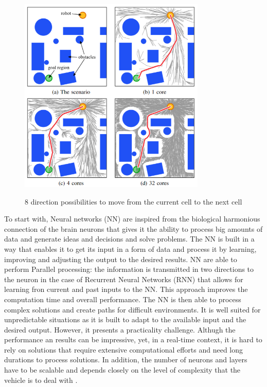 \begin{figure}[H]
    \begin{center}
       \includegraphics[width=3.5in]{images/Chap1/sampling-based.png}\\
       \caption{8 direction possibilities to move from the current cell to the next cell \cite{R16}}
       \label{sampling-based}
       \end{center}
\end{figure}

To start with, Neural networks (NN) are inspired from the biological harmonious connection of the brain neurons
that gives it the ability to process big amounts of data and generate ideas and decisions and solve problems. 
The NN is built in a way that enables it to get its input in a form of data and process it by learning, improving 
and adjusting the output to the desired results. NN are able to perform Parallel processing: the information is 
transmitted in two
directions to the neuron in the case of Recurrent Neural Networks (RNN) that allows for learning fron current and 
past inputs to the NN. This approach improves the computation time and overall performance. 
The NN is then able to process complex solutions and create paths for difficult environments. 
It is well suited for unpredictable situations as it is built to adapt to the available input and the desired output.
However, it presents a practicality challenge. Althugh the performance an results can be impressive, yet, in a 
real-time context, 
it is hard to rely on solutions that require extensive computational efforts and need long durations to 
process solutions. In addition, the number of neurons and layers have to be scalable and depends closely on the 
level of complexity that the vehicle is to deal with \cite{R12}. 

